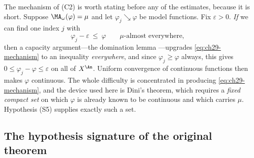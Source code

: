 The mechanism of (C2) is worth stating before any of the estimates, because
it is short.  Suppose $\MA_\omega(\varphi)=\mu$ and let
$\varphi_j\searrow\varphi$ be model functions.  Fix $\varepsilon>0$.
\emph{If} we can find one index $j$ with
\begin{equation}
\label{eq:ch29-mechanism}
 \varphi_j-\varepsilon\ \leq\ \varphi
 \qquad\mu\text{-almost everywhere},
\end{equation}
then a capacity argument---the domination lemma
---upgrades
\eqref{eq:ch29-mechanism} to an inequality \emph{everywhere}, and since
$\varphi_j\geq\varphi$ always, this gives
$0\leq\varphi_j-\varphi\leq\varepsilon$ on all of $X^{\An}$.  Uniform
convergence of continuous functions then makes $\varphi$ continuous.  The
whole difficulty is concentrated in producing \eqref{eq:ch29-mechanism}, and
the device used here is Dini's theorem, which requires a
\emph{fixed compact set} on which $\varphi$ is already known to be
continuous and which carries $\mu$.  Hypothesis \textup{(S5)} supplies
exactly such a set.

\subsection{The hypothesis signature of the original theorem}
\label{sec:ch29-signature}

